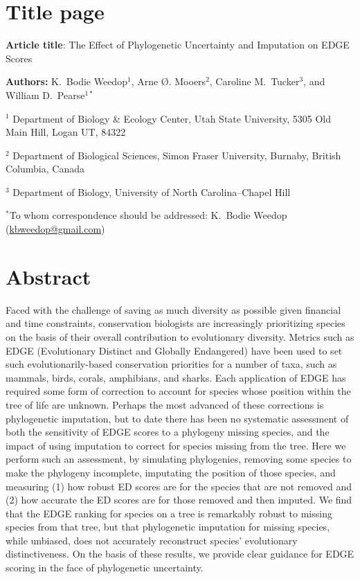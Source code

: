 \documentclass[10pt,english]{article}
\begin{document}
\setlength{\parindent}{0pt}
\section*{Title page}

\textbf{Article title}: The Effect of Phylogenetic Uncertainty and Imputation on EDGE Scores

\textbf{Authors:} K.\ Bodie Weedop$^{1}$, Arne \O. Mooers$^2$, Caroline M.\ Tucker$^3$, and William D.\ Pearse$^{1*}$\

$^1$ Department of Biology \& Ecology Center, Utah State University,
5305 Old Main Hill, Logan UT, 84322

$^2$ Department of Biological Sciences, Simon Fraser University, Burnaby,
British Columbia, Canada

$^3$ Department of Biology, University of North Carolina–Chapel Hill

$^*$To whom correspondence should be addressed: K.\ Bodie Weedop (\url{kbweedop@gmail.com})

\clearpage
\section*{Abstract}

Faced with the challenge of saving as much diversity as possible given financial
and time constraints, conservation biologists are increasingly prioritizing
species on the basis of their overall contribution to evolutionary diversity.
Metrics such as EDGE (Evolutionary Distinct and Globally Endangered) have been
used to set such evolutionarily-based conservation priorities for a number of
taxa, such as mammals, birds, corals, amphibians, and sharks. Each application
of EDGE has required some form of correction to account for species whose
position within the tree of life are unknown. Perhaps the most advanced of these
corrections is phylogenetic imputation, but to date there has been no systematic
assessment of both the sensitivity of EDGE scores to a phylogeny missing
species, and the impact of using imputation to correct for species missing from
the tree. Here we perform such an assessment, by simulating phylogenies,
removing some species to make the phylogeny incomplete, imputating the position
of those species, and measuring (1) how robust ED scores are for the species
that are not removed and (2) how accurate the ED scores are for those removed
and then imputed. We find that the EDGE ranking for species on a tree is
remarkably robust to missing species from that tree, but that phylogenetic
imputation for missing species, while unbiased, does not accurately reconstruct
species’ evolutionary distinctiveness. On the basis of these results, we provide
clear guidance for EDGE scoring in the face of phylogenetic uncertainty.
\end{document}
